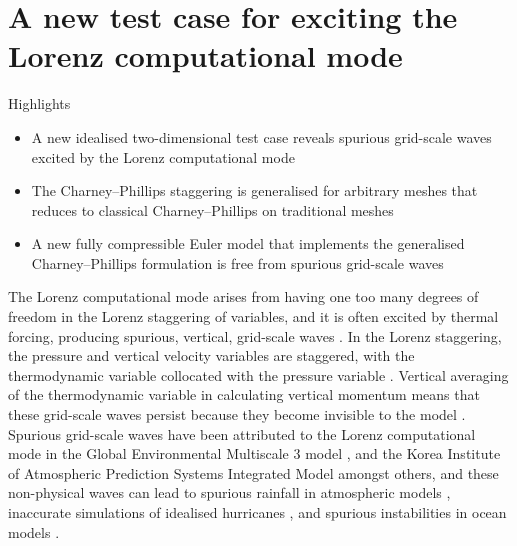\chapter{A new test case for exciting the Lorenz computational mode}
\label{ch:cp}

\begin{highlights}
{\Large Highlights}
\begin{itemize}
	\item A new idealised two-dimensional test case reveals spurious grid-scale waves excited by the Lorenz computational mode
	\item The Charney--Phillips staggering is generalised for arbitrary meshes that reduces to classical Charney--Phillips on traditional meshes
	\item A new fully compressible Euler model that implements the generalised Charney--Phillips formulation is free from spurious grid-scale waves
\end{itemize}
\end{highlights}

The Lorenz computational mode arises from having one too many degrees of freedom in the Lorenz staggering of variables, and it is often excited by thermal forcing, producing spurious, vertical, grid-scale waves \citep{schneider1987,arakawa-konor1996}.
In the Lorenz staggering, the pressure and vertical velocity variables are staggered, with the thermodynamic variable collocated with the pressure variable \citep{lorenz1960}.
Vertical averaging of the thermodynamic variable in calculating vertical momentum means that these grid-scale waves persist because they become invisible to the model \citep{arakawa-konor1996}.
Spurious grid-scale waves have been attributed to the Lorenz computational mode in the Global Environmental Multiscale 3 model \citep{girard2014}, and the Korea Institute of Atmospheric Prediction Systems Integrated Model \citep{yi-park2017} amongst others, and these non-physical waves can lead to spurious rainfall in atmospheric models \citep{hollingsworth1995}, inaccurate simulations of idealised hurricanes \citep{zhu-smith2003}, and spurious instabilities in ocean models \citep{bell-white2017}.

